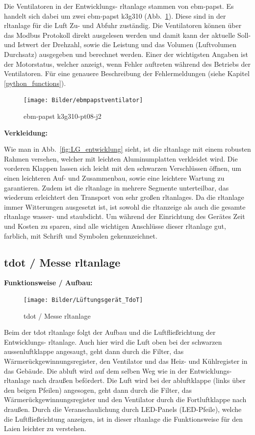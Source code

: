 Die Ventilatoren in der Entwicklungs- \ac{rltanlage} stammen von ebm-papst. Es handelt sich dabei um zwei ebm-papst k3g310 (Abb.~\ref{fig:ebmpapstventilator}). Diese sind in der \ac{rltanlage} für die Luft Zu- und Abfuhr zuständig. Die Ventilatoren können über das Modbus Protokoll direkt ausgelesen werden und damit kann der aktuelle Soll- und Istwert der Drehzahl, sowie die Leistung und das Volumen (Luftvolumen Durchsatz) ausgegeben und berechnet werden. Einer der wichtigsten Angaben ist der Motorstatus, welcher anzeigt, wenn Fehler auftreten während des Betriebs der Ventilatoren. Für eine genauere Beschreibung der Fehlermeldungen (siehe Kapitel \ref{python_functions}).

\begin{figure}[H]
	\centering
	\texttt{[image: Bilder/ebmpapstventilator]}
	\caption{ebm-papst k3g310-pt08-j2} 
	\label{fig:ebmpapstventilator}
\end{figure}

\textbf{Verkleidung:}

Wie man in Abb.~\ref{fig:LG_entwicklung} sieht, ist die \ac{rltanlage} mit einem robusten Rahmen versehen, welcher mit leichten Aluminumplatten verkleidet wird. Die vorderen Klappen lassen sich leicht mit den schwarzen Verschlüssen öffnen, um einen leichteren Auf- und Zusammenbau, sowie eine leichtere Wartung zu garantieren. Zudem ist die \ac{rltanlage} in mehrere Segmente unterteilbar, das wiederum erleichtert den Transport von sehr großen \acp{rltanlage}. Da die \ac{rltanlage} immer Witterungen ausgesetzt ist, ist sowohl die \ac{rltanzeige} als auch die gesamte \ac{rltanlage} wasser- und staubdicht. Um während der Einrichtung des Gerätes Zeit und Kosten zu sparen, sind alle wichtigen Anschlüsse dieser \ac{rltanlage} gut, farblich, mit Schrift und Symbolen gekennzeichnet. 




\newpage
\subsection{\gls{tdot} / Messe \ac{rltanlage}}

\textbf{Funktionsweise / Aufbau:}
\begin{figure}[H]
	\centering
	\texttt{[image: Bilder/Lüftungsgerät\_TdoT]}
	\caption{\gls{tdot} / Messe \ac{rltanlage}} 
	\label{fig:LG_tdot}
\end{figure}

Beim der \gls{tdot} \ac{rltanlage} folgt der Aufbau und die Luftfließrichtung der Entwicklungs- \ac{rltanlage}. Auch hier wird die Luft oben bei der schwarzen \gls{aussenluft}klappe angesaugt, geht dann durch die Filter, das Wärmerückgewinnungsregister, den Ventilator und das Heiz- und Kühlregister in das Gebäude. Die \gls{abluft} wird auf dem selben Weg wie in der Entwicklungs- \ac{rltanlage} nach draußen befördert. Die Luft wird bei der \gls{abluft}klappe (links über den beigen Pfeilen) angesogen, geht dann durch die Filter, das Wärmerückgewinnungsregister und den Ventilator durch die Fortluftklappe nach draußen. Durch die Veranschaulichung durch LED-Panels (LED-Pfeile), welche die Luftfließrichtung anzeigen, ist in dieser \ac{rltanlage} die Funktionsweise für den Laien leichter zu verstehen.

